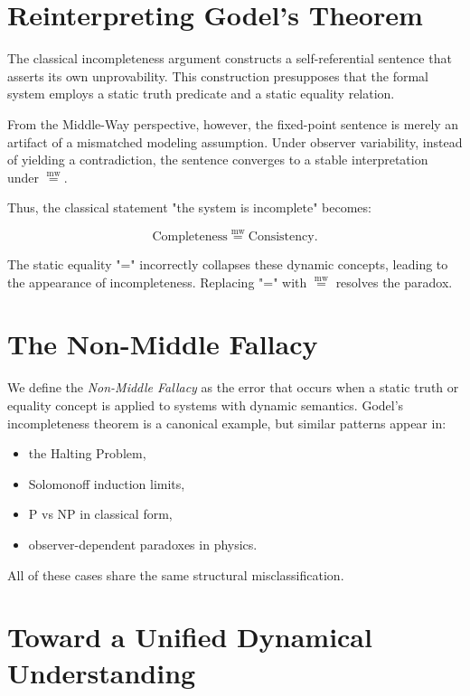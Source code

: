 \documentclass[11pt]{article}
\newcommand{\mweq}{\overset{\mathrm{mw}}{=}}
\begin{document}
\section{Reinterpreting Godel's Theorem}

The classical incompleteness argument constructs a self-referential sentence 
that asserts its own unprovability. This construction presupposes that the 
formal system employs a static truth predicate and a static equality relation.

From the Middle-Way perspective, however, the fixed-point sentence is merely 
an artifact of a mismatched modeling assumption. Under observer variability, 
instead of yielding a contradiction, the sentence converges to a stable 
interpretation under $\mweq$.

Thus, the classical statement "the system is incomplete" becomes:

\begin{equation}
\text{Completeness} \mweq \text{Consistency}.
\end{equation}

The static equality "=" incorrectly collapses these dynamic concepts, 
leading to the appearance of incompleteness. Replacing "=" with $\mweq$ 
resolves the paradox.

\section{The Non-Middle Fallacy}

We define the \emph{Non-Middle Fallacy} as the error that occurs when a 
static truth or equality concept is applied to systems with dynamic semantics. 
Godel's incompleteness theorem is a canonical example, but similar patterns 
appear in:

\begin{itemize}
    \item the Halting Problem,
    \item Solomonoff induction limits,
    \item P vs NP in classical form,
    \item observer-dependent paradoxes in physics.
\end{itemize}

All of these cases share the same structural misclassification.

\section{Toward a Unified Dynamical Understanding}
\end{document}

